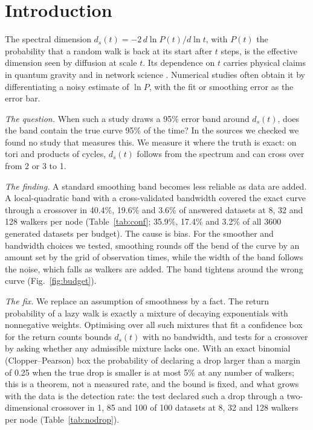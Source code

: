 \documentclass[aps,pre,twocolumn,superscriptaddress,nofootinbib,10pt]{revtex4-2}
\newcommand{\dt}{d_s(t)}
\begin{document}
\section{Introduction}
The spectral dimension $\dt=-2\,d\ln P(t)/d\ln t$, with $P(t)$ the probability that a random walk is back at its start after $t$ steps, is the effective dimension seen by diffusion at scale $t$. Its dependence on $t$ carries physical claims in quantum gravity \cite{ajl2005,em2014,belenchia2016,carlip2015} and in network science \cite{millan2021,grimaldi2026}. Numerical studies often obtain it by differentiating a noisy estimate of $\ln P$, with the fit or smoothing error as the error bar.

\emph{The question.} When such a study draws a 95\% error band around $\dt$, does the band contain the true curve 95\% of the time? In the sources we checked we found no study that measures this. We measure it where the truth is exact: on tori and products of cycles, $\dt$ follows from the spectrum and can cross over from 2 or 3 to 1.

\emph{The finding.} A standard smoothing band becomes less reliable as data are added. A local-quadratic band with a cross-validated bandwidth covered the exact curve through a crossover in 40.4\%, 19.6\% and 3.6\% of answered datasets at 8, 32 and 128 walkers per node (Table~\ref{tab:conf}; 35.9\%, 17.4\% and 3.2\% of all 3600 generated datasets per budget). The cause is bias. For the smoother and bandwidth choices we tested, smoothing rounds off the bend of the curve by an amount set by the grid of observation times, while the width of the band follows the noise, which falls as walkers are added. The band tightens around the wrong curve (Fig.~\ref{fig:budget}).

\emph{The fix.} We replace an assumption of smoothness by a fact. The return probability of a lazy walk is exactly a mixture of decaying exponentials with nonnegative weights. Optimising over all such mixtures that fit a confidence box for the return counts bounds $\dt$ with no bandwidth, and tests for a crossover by asking whether any admissible mixture lacks one. With an exact binomial (Clopper--Pearson) box the probability of declaring a drop larger than a margin of 0.25 when the true drop is smaller is at most 5\% at any number of walkers; this is a theorem, not a measured rate, and the bound is fixed, and what grows with the data is the detection rate: the test declared such a drop through a two-dimensional crossover in 1, 85 and 100 of 100 datasets at 8, 32 and 128 walkers per node (Table~\ref{tab:nodrop}).
\end{document}
